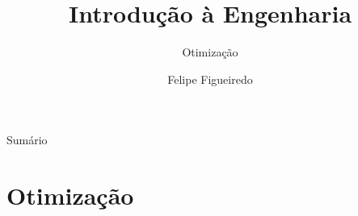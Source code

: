 \documentclass{beamer}
\title%
{Introdução à Engenharia}
\subtitle
{Otimização} %
\author%
{Felipe Figueiredo}%
\institute[UNIAN] %
{Centro Universitário Anhanguera de Niterói
}
\date%
{}
\begin{document}
\begin{frame}
  \titlepage
\end{frame}

\begin{frame}{Sumário}
  \tableofcontents
\end{frame}








\section{Otimização}
\end{document}
